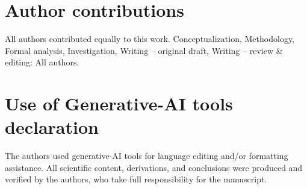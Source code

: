 \documentclass{article}
\numberwithin{equation}{section}
\begin{document}
\section*{Author contributions}
All authors contributed equally to this work.
Conceptualization, Methodology, Formal analysis, Investigation, Writing -- original draft,
Writing -- review \& editing: All authors.


\section*{Use of Generative-AI tools declaration}

The authors used generative-AI tools for language editing and/or formatting assistance. All scientific content,
derivations, and conclusions were produced and verified by the authors, who take full responsibility for the
manuscript.






\end{document}
